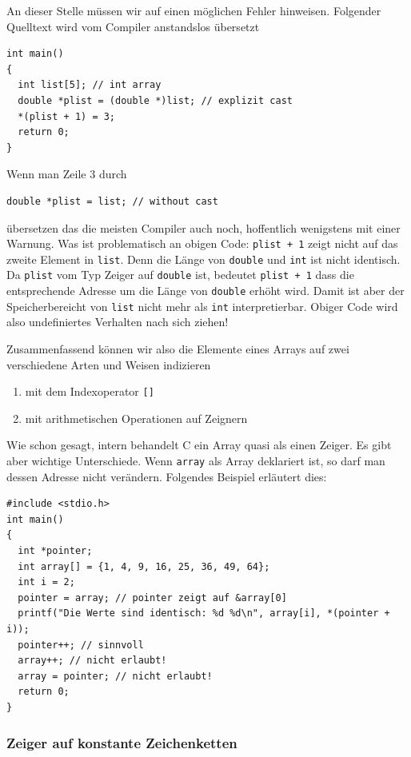 An dieser Stelle müssen wir auf einen möglichen Fehler hinweisen.
Folgender Quelltext wird vom Compiler anstandslos übersetzt
\begin{lstlisting}
int main()
{
  int list[5]; // int array
  double *plist = (double *)list; // explizit cast
  *(plist + 1) = 3;
  return 0;
}
\end{lstlisting}
Wenn man Zeile $3$ durch
\begin{lstlisting}
double *plist = list; // without cast
\end{lstlisting}
übersetzen das die meisten Compiler auch noch, hoffentlich wenigstens mit einer Warnung.
Was ist problematisch an obigen Code:
\verb|plist + 1| zeigt nicht auf das zweite Element in \verb|list|.
Denn die Länge von \verb|double| und \verb|int| ist nicht identisch.
Da \verb|plist| vom Typ Zeiger auf \verb|double| ist, bedeutet \verb|plist + 1| dass die entsprechende Adresse um die Länge von \verb|double| erhöht wird.
Damit ist aber der Speicherbereicht von \verb|list| nicht mehr als \verb|int| interpretierbar.
Obiger Code wird also undefiniertes Verhalten nach sich ziehen!

Zusammenfassend können wir also die Elemente eines Arrays auf zwei verschiedene Arten und Weisen indizieren
\begin{enumerate}
\item mit dem Indexoperator \verb|[]|
\item mit arithmetischen Operationen auf Zeignern
\end{enumerate}
Wie schon gesagt, intern behandelt C ein Array quasi als einen Zeiger.
Es gibt aber wichtige Unterschiede.
Wenn \verb|array| als Array deklariert ist, so darf man dessen Adresse nicht verändern.
Folgendes Beispiel erläutert dies:
\begin{lstlisting}
#include <stdio.h>
int main()
{
  int *pointer;
  int array[] = {1, 4, 9, 16, 25, 36, 49, 64};
  int i = 2;
  pointer = array; // pointer zeigt auf &array[0]
  printf("Die Werte sind identisch: %d %d\n", array[i], *(pointer + i));
  pointer++; // sinnvoll
  array++; // nicht erlaubt!
  array = pointer; // nicht erlaubt!
  return 0;
}
\end{lstlisting}

\subsubsection{Zeiger auf konstante Zeichenketten}

